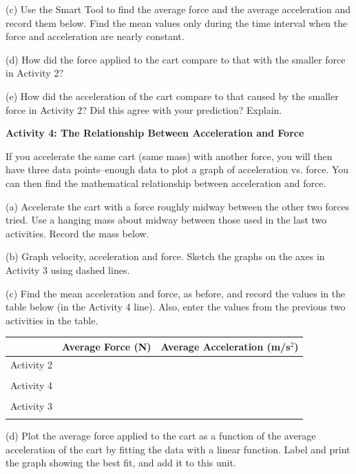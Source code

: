 (c) Use the Smart Tool to find the average force and the average acceleration
and record them below. Find the mean values only during the time interval when
the force and acceleration are nearly constant.
\answerspace{15mm}

(d) How did the force applied to the cart compare to that with the smaller force
in Activity 2?
\answerspace{15mm}

(e) How did the acceleration of the cart compare to that caused by the smaller
force in Activity 2? Did this agree with your prediction? Explain.
\answerspace{15mm}

\pagebreak[2]
\textbf{Activity 4: The Relationship Between Acceleration and Force }

If you accelerate the same cart (same mass) with another force, you will then
have three data points--enough data to plot a graph of acceleration vs. force.
You can then find the mathematical relationship between acceleration and force. 

(a) Accelerate the cart with a force roughly midway between the other two forces
tried. Use a hanging mass about midway between those used in the last two activities.
Record the mass below.
\answerspace{10mm}

(b) Graph velocity, acceleration and force. Sketch the graphs on the axes in
Activity 3 using dashed lines.

(c) Find the mean acceleration and force, as before, and record the values in
the table below (in the Activity 4 line). Also, enter the values from the previous two activities in the table.

\vspace{0.3cm}
{\centering \begin{tabular}{|c|c|c|}
\hline 
&
Average Force (N)&
Average Acceleration (m/s\( ^{2} \))\\
\hline 
Activity 2&
&
\\
&
&
\\
\hline 
Activity 4&
&
\\
&
&
\\
\hline 
Activity 3&
&
\\
&
&
\\
\hline 
\end{tabular}\par}
\vspace{0.3cm}

(d) Plot the average force applied to the cart as a function of the average acceleration of the cart by fitting the data with a linear function. Label and print the graph showing the best fit, and add it to this unit.

